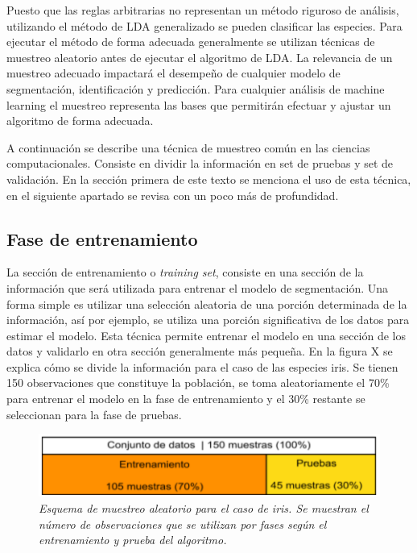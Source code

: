 \documentclass[letterpaper,12pt, spanish, oneside]{book} %
\begin{document}
Puesto que las reglas arbitrarias no representan un método riguroso de análisis, utilizando el método de LDA generalizado se pueden clasificar las especies. Para ejecutar el método de forma adecuada generalmente se utilizan técnicas de muestreo aleatorio antes de ejecutar el algoritmo de LDA. La relevancia de un muestreo adecuado impactará el desempeño de cualquier modelo de segmentación, identificación y predicción. Para cualquier análisis de machine learning el muestreo representa las bases que permitirán efectuar y ajustar un algoritmo de forma adecuada. 

A continuación se describe una técnica de muestreo común en las ciencias computacionales. Consiste en dividir la información en set de pruebas y set de validación. En la sección primera de este texto se menciona el uso de esta técnica, en el siguiente apartado se revisa con un poco más de profundidad.

\subsection{Fase de entrenamiento}

La sección de entrenamiento o \textit{training set}, consiste en una sección de la información que será utilizada para entrenar el modelo de segmentación. Una forma simple es utilizar una selección aleatoria de una porción determinada de la información, así por ejemplo, se utiliza una porción significativa de los datos para estimar el modelo. Esta técnica permite entrenar el modelo en una sección de los datos y validarlo en otra sección generalmente más pequeña. En la figura X se explica cómo se divide la información para el caso de las especies iris. Se tienen 150 observaciones que constituye la población, se toma aleatoriamente el 70\% para entrenar el modelo en la fase de entrenamiento y el 30\% restante se seleccionan para la fase de pruebas.

\begin{figure}[H]
\centering
\includegraphics[width=1\textwidth]{fase1.png}
\caption{\label{fig:frog2}\textit{Esquema de muestreo aleatorio para el caso de iris. Se muestran el número de observaciones que se utilizan por fases según el entrenamiento y prueba del algoritmo.}}
\end{figure}
\end{document}
